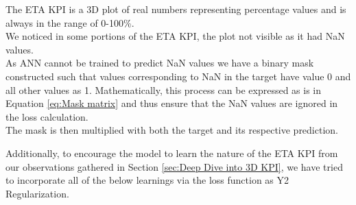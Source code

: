 \documentclass{report} %
\begin{document}

\vspace{1em} %


The ETA \ac{KPI} is a \ac{3D} plot of real numbers representing percentage values and is always in the range of 0-100\%.\\
We noticed in some portions of the ETA \ac{KPI}, the plot not visible as it had \ac{NaN} values.\\
As ANN cannot be trained to predict \ac{NaN} values we have a binary mask constructed such that values corresponding to \ac{NaN} in the target have value 0 and all other values as 1.
Mathematically, this process can be expressed as is in Equation \ref{eq:Mask matrix} and thus ensure that the \ac{NaN} values are ignored in the loss calculation. \\ 
The mask is then multiplied with both the target and its respective prediction. 

Additionally, to encourage the model to learn the nature of the ETA \ac{KPI} from our observations gathered in Section \ref{sec:Deep Dive into 3D KPI}, we have tried to incorporate all of the below learnings via the loss function as Y2 Regularization.\\
\end{document}
